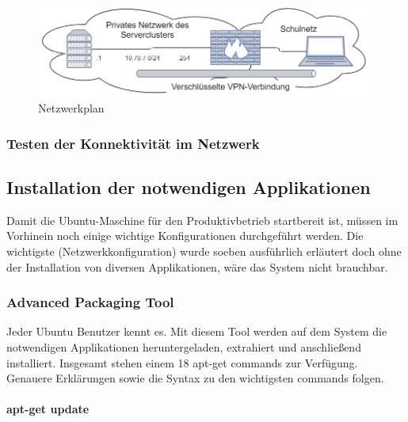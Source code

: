 \begin{figure}[ht]
\centering
\includegraphics{topo1.png}
\caption{Netzwerkplan}
\end{figure}

\hypertarget{testen-der-konnektivituxe4t-im-netzwerk}{%
\subsubsection{Testen der Konnektivität im
Netzwerk}\label{testen-der-konnektivituxe4t-im-netzwerk}}

\hypertarget{installation-der-notwendigen-applikationen}{%
\subsection{Installation der notwendigen
Applikationen}\label{installation-der-notwendigen-applikationen}}

Damit die Ubuntu-Maschine für den Produktivbetrieb startbereit ist,
müssen im Vorhinein noch einige wichtige Konfigurationen durchgeführt
werden. Die wichtigste (Netzwerkkonfiguration) wurde soeben ausführlich
erläutert doch ohne der Installation von diversen Applikationen, wäre
das System nicht brauchbar.

\hypertarget{advanced-packaging-tool}{%
\subsubsection{Advanced Packaging Tool}\label{advanced-packaging-tool}}

Jeder Ubuntu Benutzer kennt es. Mit diesem Tool werden auf dem System
die notwendigen Applikationen heruntergeladen, extrahiert und
anschließend installiert. Insgesamt stehen einem 18 apt-get commands zur
Verfügung. Genauere Erklärungen sowie die Syntax zu den wichtigsten
commands folgen.

\hypertarget{apt-get-update}{%
\paragraph{apt-get update}\label{apt-get-update}}

